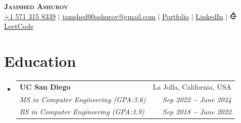 \documentclass[letterpaper,11pt]{article}
\makeatletter
\newcommand{\faLeetcode}{\includegraphics[height=1em]{leetcode.png}}
\newcommand{\resumeEducationHeading}[6]{
  \vspace{-2pt}\item
    \begin{tabular*}{0.97\textwidth}[t]{l@{\extracolsep{\fill}}r}
      \textcolor{secondary_color}{\textbf{#1}} & \textcolor{secondary_color}{#2} \\
      \textit{\small#3} & \textit{\small #4} \\
      \textit{\small#5} & \textit{\small #6} \\
    \end{tabular*}\vspace{-5pt}
}
\newcommand{\resumeEducationListStart}{\begin{itemize}[leftmargin=0in, label={}]}
\newcommand{\resumeEducationListEnd}{\end{itemize}}
\makeatother
\begin{document}

\begin{center}
    \textbf{\Huge \scshape \textcolor{main_color}{Jamshed Ashurov}} \\ \vspace{3pt}
    \small
    \faMobile \hspace{.5pt} \href{tel:15713158339}{+1 571 315 8339}
    $|$
    \faAt \hspace{.5pt} \href{mailto:jamshed00ashurov@gmail.com}{jamshed00ashurov@gmail.com}
    $|$
    \faGlobe \hspace{.5pt} \href{https://ashurja.github.io/}{\textcolor{secondary_color}{Portfolio}}
    $|$
    \faLinkedinSquare \hspace{.5pt} \href{https://www.linkedin.com/in/jamshed-ashurov/}{\textcolor{secondary_color}{LinkedIn}}
    $|$
    \faLeetcode \hspace{.5pt} \href{https://leetcode.com/u/jashurov/}{\textcolor{secondary_color}{LeetCode}}
\end{center}




\section{Education}
  \vspace{3pt}
  \resumeEducationListStart
    \resumeEducationHeading
        {UC San Diego}{La Jolla, California, USA}
        {MS in Computer Engineering (GPA:3.6)}{Sep 2022 \textbf{--} June 2024}
        {BS in Computer Engineering (GPA:3.9)}{Sep 2018 \textbf{--} June 2022}
  \resumeEducationListEnd

\end{document}
